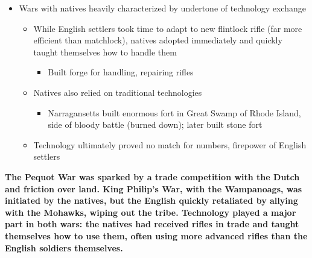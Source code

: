 \documentclass[a4paper]{article}
\begin{document}
{\begin{itemize}
\begin{itemize}
            \item French posed threat by allying with Algonquins, later attacking English
        \end{itemize}
        \item Wars with natives heavily characterized by undertone of technology exchange
        \begin{itemize}
            \item While English settlers took time to adapt to new flintlock rifle (far more efficient than matchlock), natives adopted immediately and quickly taught themselves how to handle them
            \begin{itemize}
                \item Built forge for handling, repairing rifles
            \end{itemize}
            \item Natives also relied on traditional technologies
            \begin{itemize}
                \item Narragansetts built enormous fort in Great Swamp of Rhode Island, side of bloody battle (burned down); later built stone fort
            \end{itemize}
            \item Technology ultimately proved no match for numbers, firepower of English settlers
        \end{itemize}
    \end{itemize}
    \textbf{The Pequot War was sparked by a trade competition with the Dutch and friction over land. King Philip's War, with the Wampanoags, was initiated by the natives, but the English quickly retaliated by allying with the Mohawks, wiping out the tribe. Technology played a major part in both wars: the natives had received rifles in trade and taught themselves how to use them, often using more advanced rifles than the English soldiers themselves.}}
\end{document}
